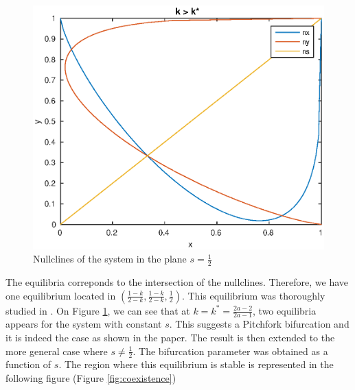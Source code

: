 \documentclass{article}
\begin{document}
\begin{figure}[H]
\includegraphics[scale=0.5]{nullpg.eps}
\caption{Nullclines of the system in the plane $s=\frac{1}{2}$}
\label{fig:nullclines}
\end{figure}

The equilibria correponds to the intersection of the nullclines.
Therefore, we have one equilibrium located in $(\frac{1-k}{2-k}, \frac{1-k}{2-k}, \frac{1}{2})$.
This equilibrium was thoroughly studied in \cite{bilingual}.
On Figure \ref{fig:nullclines}, we can see that at $k=k^{\ast}=\frac{2a-2}{2a-1}$, two equilibria appears for the system with constant $s$.
This suggests a Pitchfork bifurcation and it is indeed the case as shown in the paper.
The result is then extended to the more general case where $s \ne \frac{1}{2}$.
The bifurcation parameter was obtained as a function of $s$.
The region where this equilibrium is stable is represented in the following figure (Figure \ref{fig:coexistence})
\end{document}
